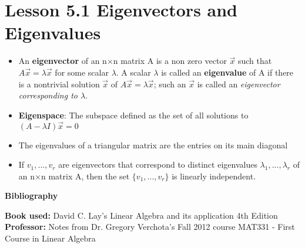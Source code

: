 \documentclass{report}
\newcommand{\nxn}{n$\times$n}
\begin{document}
	\section{Lesson 5.1 Eigenvectors and Eigenvalues}
		\begin{itemize}\addtolength{\leftskip}{2em}
			\item An \textbf{eigenvector} of an {\nxn} matrix A is a non zero vector $\vec{x}$ such that $A\vec{x}=\lambda\vec{x}$ for some scalar $\lambda$. A scalar $\lambda$ is called an \textbf{eigenvalue} of A if there is a nontrivial solution $\vec{x}$ of $A\vec{x}=\lambda\vec{x}$; such an $\vec{x}$ is called an \textit{eigenvector corresponding to $\lambda$}.
			\item \textbf{Eigenspace}: The subspace defined as the set of all solutions to $(A-\lambda I)\vec{x}=0$
			\item The eigenvalues of a triangular matrix are the entries on its main diagonal
			\item If $v_1,...,v_r$ are eigenvectors that correspond to distinct eigenvalues $\lambda_1,...,\lambda_r$ of an {\nxn} matrix A, then the set $\{v_1,...,v_r \}$ is linearly independent.
		\end{itemize}

	\begin{center}
	\newpage
	\textbf{\huge{Bibliography}}
	\end{center}
	\textbf{Book used:} David C. Lay's Linear Algebra and its application 4th Edition\newline
	\textbf{Professor:} Notes from Dr. Gregory Verchota's Fall 2012 course MAT331 - First Course in Linear Algebra
\end{document}
